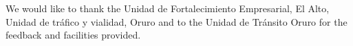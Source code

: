 \documentclass[fleqn,12pt]{SelfArx} %
\begin{document}

We would like to thank the Unidad de Fortalecimiento Empresarial, El Alto, Unidad de tráfico y vialidad, Oruro and to the Unidad de Tránsito Oruro for the feedback and facilities provided.

%
%

\end{document}
